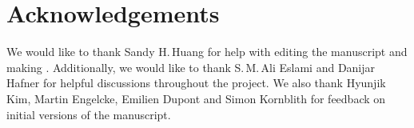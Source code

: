 \section{Acknowledgements}
We would like to thank Sandy H.\,Huang for help with editing the manuscript and making .
Additionally, we would like to thank S.\,M.\,Ali Eslami and Danijar Hafner for helpful discussions throughout the project. We also thank Hyunjik Kim, Martin Engelcke, Emilien Dupont and Simon Kornblith for feedback on initial versions of the manuscript.